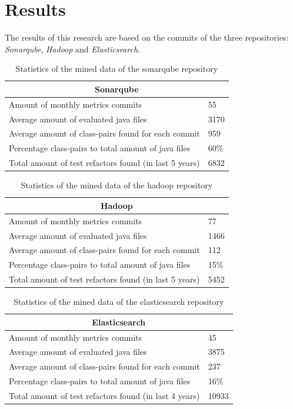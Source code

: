 \section{Results}
The results of this research are based on the commits of the three repositories: \textit{Sonarqube}, \textit{Hadoop} and \textit{Elasticsearch}.

\begin{table}[h!]
\centering
\begin{tabular}{|l|l|}
\hline
\multicolumn{2}{|c|}{Sonarqube} \\ \hline
Amount of monthly metrics commits & 55  \\ \hline
Average amount of evaluated java files & 3170  \\ \hline
Average amount of class-pairs found for each commit & 959 \\ \hline
Percentage class-pairs to total amount of java files & 60\% \\ \hline
Total amount of test refactors found (in last 5 years) & 6832 \\ \hline
\end{tabular}
\caption{Statistics of the mined data of the sonarqube repository}
\label{table:6}
\end{table}

\begin{table}[h!]
\centering
\begin{tabular}{|l|l|}
\hline
\multicolumn{2}{|c|}{Hadoop} \\ \hline
Amount of monthly metrics commits & 77 \\ \hline
Average amount of evaluated java files & 1466  \\ \hline
Average amount of class-pairs found for each commit & 112 \\ \hline
Percentage class-pairs to total amount of java files & 15\% \\ \hline
Total amount of test refactors found (in last 5 years) & 5452 \\ \hline
\end{tabular}
\caption{Statistics of the mined data of the hadoop repository}
\label{table:7}
\end{table}


\begin{table}[h!]
\centering
\begin{tabular}{|l|l|}
\hline
\multicolumn{2}{|c|}{Elasticsearch} \\ \hline
Amount of monthly metrics commits & 45  \\ \hline
Average amount of evaluated java files & 3875  \\ \hline
Average amount of class-pairs found for each commit & 237 \\ \hline
Percentage class-pairs to total amount of java files & 16\% \\ \hline
Total amount of test refactors found (in last 4 years) & 10933 \\ \hline
\end{tabular}
\caption{Statistics of the mined data of the elasticsearch repository}
\label{table:8}
\end{table}

